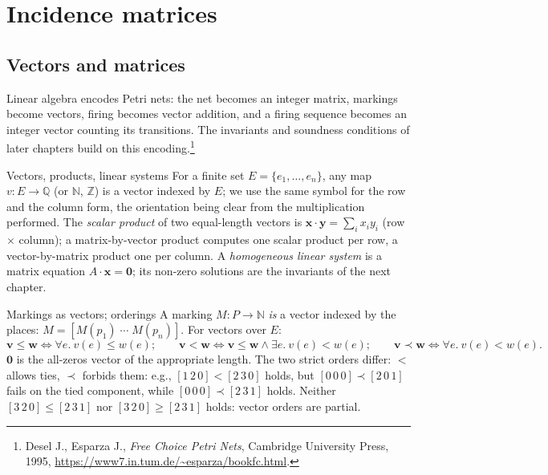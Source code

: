 \section{Incidence matrices}

\subsection{Vectors and matrices}

Linear algebra encodes Petri nets: the net becomes an integer matrix, markings become vectors, firing becomes vector addition, and a firing sequence becomes an integer vector counting its transitions. The invariants and soundness conditions of later chapters build on this encoding.\footnote{Desel J., Esparza J., \emph{Free Choice Petri Nets}, Cambridge University Press, 1995, \url{https://www7.in.tum.de/~esparza/bookfc.html}.}

\begin{definitionbox}{Vectors, products, linear systems}
For a finite set $E = \{e_1, \ldots, e_n\}$, any map $v : E \to \mathbb{Q}$ (or $\mathbb{N}$, $\mathbb{Z}$) is a vector indexed by $E$; we use the same symbol for the row and the column form, the orientation being clear from the multiplication performed. The \emph{scalar product} of two equal-length vectors is $\mathbf{x} \cdot \mathbf{y} = \sum_i x_i y_i$ (row $\times$ column); a matrix-by-vector product computes one scalar product per row, a vector-by-matrix product one per column. A \emph{homogeneous linear system} is a matrix equation $A \cdot \mathbf{x} = \mathbf{0}$; its non-zero solutions are the invariants of the next chapter.
\end{definitionbox}

\begin{definitionbox}{Markings as vectors; orderings}
A marking $M : P \to \mathbb{N}$ \emph{is} a vector indexed by the places: $M = [M(p_1)\; \cdots\; M(p_n)]$. For vectors over $E$:
\[
  \mathbf{v} \leq \mathbf{w} \iff \forall e.\ v(e) \leq w(e); \qquad
  \mathbf{v} < \mathbf{w} \iff \mathbf{v} \leq \mathbf{w} \wedge \exists e.\ v(e) < w(e); \qquad
  \mathbf{v} \prec \mathbf{w} \iff \forall e.\ v(e) < w(e).
\]
$\mathbf{0}$ is the all-zeros vector of the appropriate length. The two strict orders differ: $<$ allows ties, $\prec$ forbids them: e.g., $[1\,2\,0] < [2\,3\,0]$ holds, but $[0\,0\,0] \prec [2\,0\,1]$ fails on the tied component, while $[0\,0\,0] \prec [2\,3\,1]$ holds. Neither $[3\,2\,0] \leq [2\,3\,1]$ nor $[3\,2\,0] \geq [2\,3\,1]$ holds: vector orders are partial.
\end{definitionbox}

